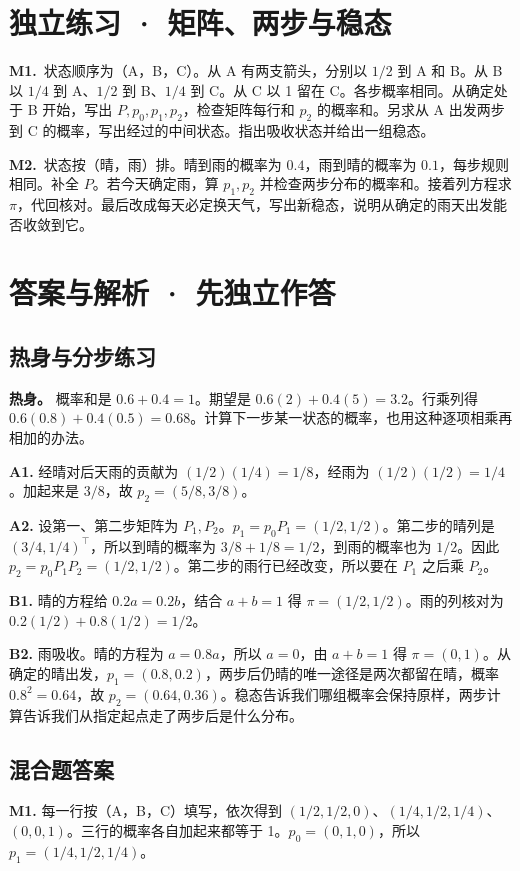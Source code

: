 \documentclass[UTF8,a4paper,11pt]{ctexart}
\newcommand{\CompactQuestion}[2]{\par\noindent\textbf{#1.}\ #2\par\vspace{.8em}}
\begin{document}
\section{独立练习 · 矩阵、两步与稳态}
\CompactQuestion{M1}{状态顺序为（A，B，C）。从 A 有两支箭头，分别以 $1/2$ 到 A 和 B。从 B 以 $1/4$ 到 A、$1/2$ 到 B、$1/4$ 到 C。从 C 以 1 留在 C。各步概率相同。从确定处于 B 开始，写出 $P,p_0,p_1,p_2$，检查矩阵每行和 $p_2$ 的概率和。另求从 A 出发两步到 C 的概率，写出经过的中间状态。指出吸收状态并给出一组稳态。}
\CompactQuestion{M2}{状态按（晴，雨）排。晴到雨的概率为 $0.4$，雨到晴的概率为 $0.1$，每步规则相同。补全 $P$。若今天确定雨，算 $p_1,p_2$ 并检查两步分布的概率和。接着列方程求 $\pi$，代回核对。最后改成每天必定换天气，写出新稳态，说明从确定的雨天出发能否收敛到它。}
\clearpage
\section{答案与解析 · 先独立作答}
\subsection{热身与分步练习}
\textbf{热身。} 概率和是 $0.6+0.4=1$。期望是 $0.6(2)+0.4(5)=3.2$。行乘列得 $0.6(0.8)+0.4(0.5)=0.68$。计算下一步某一状态的概率，也用这种逐项相乘再相加的办法。

\textbf{A1.} 经晴对后天雨的贡献为 $(1/2)(1/4)=1/8$，经雨为 $(1/2)(1/2)=1/4$。加起来是 $3/8$，故 $p_2=(5/8,3/8)$。

\textbf{A2.} 设第一、第二步矩阵为 $P_1,P_2$。$p_1=p_0P_1=(1/2,1/2)$。第二步的晴列是 $(3/4,1/4)^\top$，所以到晴的概率为 $3/8+1/8=1/2$，到雨的概率也为 $1/2$。因此 $p_2=p_0P_1P_2=(1/2,1/2)$。第二步的雨行已经改变，所以要在 $P_1$ 之后乘 $P_2$。

\textbf{B1.} 晴的方程给 $0.2a=0.2b$，结合 $a+b=1$ 得 $\pi=(1/2,1/2)$。雨的列核对为 $0.2(1/2)+0.8(1/2)=1/2$。

\textbf{B2.} 雨吸收。晴的方程为 $a=0.8a$，所以 $a=0$，由 $a+b=1$ 得 $\pi=(0,1)$。从确定的晴出发，$p_1=(0.8,0.2)$，两步后仍晴的唯一途径是两次都留在晴，概率 $0.8^2=0.64$，故 $p_2=(0.64,0.36)$。稳态告诉我们哪组概率会保持原样，两步计算告诉我们从指定起点走了两步后是什么分布。

\clearpage
\subsection{混合题答案}
\textbf{M1.} 每一行按（A，B，C）填写，依次得到 $(1/2,1/2,0)$、$(1/4,1/2,1/4)$、$(0,0,1)$。三行的概率各自加起来都等于 1。$p_0=(0,1,0)$，所以 $p_1=(1/4,1/2,1/4)$。
\end{document}
